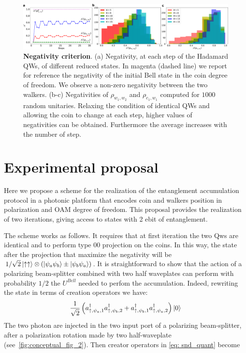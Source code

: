 \documentclass[
	aps, pra,
	superscriptaddress, twocolumn,
	floatfix,
	10pt
]{revtex4-1}
\newcommand{\parTitle}[1]{\noindent{\color{Mahogany}(\emph{#1})}}
\begin{document}
\parTitle{What did we conclude from this?}

\begin{figure}[hbt]
    \centering
    \includegraphics[width=\textwidth]{negs+rand.pdf}
    \caption{\textbf{Negativity criterion}.
    (a) Negativity, at each step of the Hadamard QWs, of different reduced states.
    In magenta (dashed line) we report for reference the negativity of the initial Bell state in the coin degree of freedom.
    We observe a non-zero negativity between the two walkers. (b-c) Negativities of $\rho_{w_1, w_2}$ and $\rho_{c_1, w_1}$ computed for $1000$ random unitaries. Relaxing the condition of identical QWs and allowing the coin to change at each step, higher values of negativities can be obtained. Furthermore the average increases with the number of step.}
    \label{fig:neg_trace}
\end{figure}



\section{Experimental proposal}
\label{sec:experimental_proposal}
Here we propose a scheme for the realization of the entanglement accumulation protocol in a photonic platform that encodes coin and walkers position in polarization and OAM degree of freedom. This proposal provides the realization of two iterations, giving access to states with 2 ebit of entanglement. 

The scheme works as follows. It requires that at first iteration the two Qws are identical and to perform type 00 projection on the coins. In this way, the state after the projection that maximize the negativity will be $1/\sqrt{2}\ket{\uparrow \uparrow}\otimes(\ket{\psi_a\psi_b}\pm\ket{\psi_b\psi_a})$. 
It is straightforward to show that the action of a polarizing beam-splitter combined with two half waveplates can perform with probability $1/2$ the $U^{Bell}$ needed to perfom the accumulation.
Indeed, rewriting the state in terms of creation operators we have:
\begin{equation}
    \frac{1}{\sqrt{2}}\left(a^{\dagger}_{\uparrow, \psi_a,1}a^{\dagger}_{\uparrow, \psi_b,2}+a^{\dagger}_{\uparrow, \psi_b,1}a^{\dagger}_{\uparrow, \psi_a,2} \right)\ket{0} 
    \label{eq: snd_quant}
\end{equation}
The two photon are injected in the two input port of a polarizing beam-splitter, after a polarization rotation made by two half-waveplate (see~\cref{fig:conceptual_fig_2}). Then creator operators in \cref{eq: snd_quant} become
\end{document}
